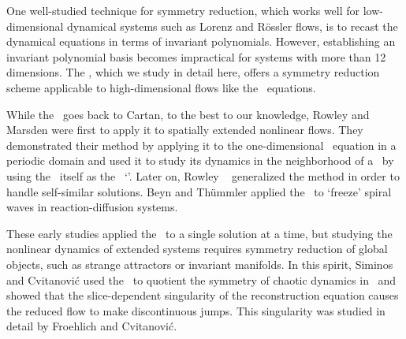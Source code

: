 One well-studied technique for symmetry reduction, which works well for low-dimensional dynamical systems such
as Lorenz and R\"{o}ssler flows, is to recast the dynamical equations in terms of invariant polynomials.
However, establishing an invariant polynomial basis becomes impractical
for systems with more than 12 dimensions.
The \mslices%
,
which we study in detail here, offers a symmetry reduction
scheme applicable to high-dimensional flows like the \NS\ equations.

While the \mslices\ goes back to Cartan, to the
best to our knowledge, Rowley and Marsden
were first to apply it to spatially extended nonlinear flows.
They demonstrated their method by applying it to the one-dimensional \KS\ equation
in a periodic domain and used it to study its dynamics in the neighborhood of
a \reqv\ by using the \reqv\ itself as the \slice\ `\template'. Later on,
Rowley \etal~ generalized the method in order
to handle self-similar solutions. Beyn and Th\"{u}mmler applied
the \mslices\ to `freeze' spiral waves in reaction-diffusion systems.

These early studies applied the \mslices\ to a single solution at a time, but
studying the nonlinear dynamics of extended systems requires symmetry reduction
of global objects, such as strange attractors or invariant manifolds.
In this spirit, Siminos and Cvitanovi\'{c} used the \mslices\ to
quotient the  symmetry of chaotic dynamics in \cLf\ and showed that the
slice-dependent singularity of the reconstruction equation
causes the reduced flow to make discontinuous jumps. This singularity was studied
in detail by Froehlich and Cvitanovi\'{c}.

